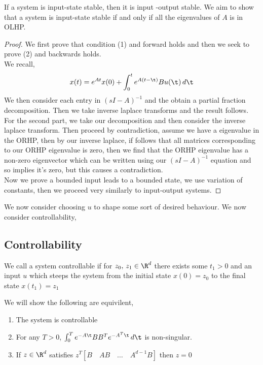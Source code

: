 \noindent
If a system is input-state stable, then it is input -output stable. We aim to show that a system is input-state stable if and only if all the eigenvalues of $A$ is in OLHP.\\
\begin{proof}
  We first prove that condition (1) and forward holds and then we seek to prove (2) and backwards holds.\\

  We recall,
  $$ x(t) = e^{At}x(0) + \int_0^t e^{A(t - \t)}Bu(\t)\,d\t $$
  We then consider each entry in $(sI - A)^{-1}$ and the obtain a partial fraction decomposition. Then we take inverse laplace transforms and the result follows.\\

  For the second part, we take our decomposition and then consider the inverse laplace transform. Then proceed by contradiction, assume we have a eigenvalue in the ORHP, then by our inverse laplace, if follows that all matrices corresponding to our ORHP eigenvalue is zero, then we find that the ORHP eigenvalue has a non-zero eigenvector which can be written using our $(sI - A)^{-1}$ equation and so implies it's zero, but this causes a contradiction.\\

  Now we prove a bounded input leads to a bounded state, we use variation of constants, then we proceed very similarly to input-output systems.
\end{proof}


We now consider choosing $u$ to shape some sort of desired behaviour. We now consider controllability,

\subsection{Controllability}

\begin{ndefi}[Controllability]
  We call a system controllable if for $z_0,\,z_1 \in \R^d$ there exists some $t_1 > 0$ and an input $u$ which steeps the system from the initial state $x(0) = z_0$ to the final state $x(t_1) = z_1$
\end{ndefi}

\begin{nthm}
  We will show the following are equivilent,
  \begin{enumerate}
    \item The system is controllable
    \item For any $T > 0$, $\int_0^T e^{-A\t}BB^T e^{-A^T\t}\,d\t$ is non-singular.
    \item If $z \in \R^d$ satisfies $z^T [B \quad AB \quad \dots \quad A^{d-1}B]$ then $z = 0$
  \end{enumerate}
\end{nthm}

